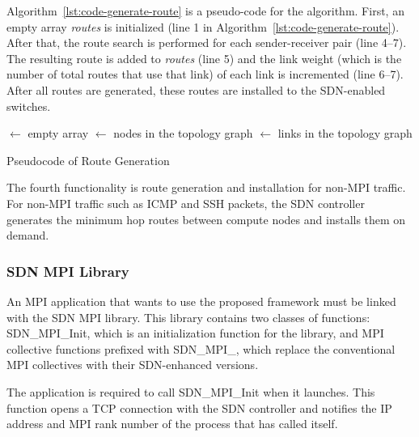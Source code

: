 Algorithm~\ref{lst:code-generate-route} is a pseudo-code for the algorithm.
First, an empty array \emph{routes} is initialized (line 1 in
Algorithm~\ref{lst:code-generate-route}). After that, the route search is
performed for each sender-receiver pair (line 4--7). The resulting route is
added to \emph{routes} (line 5) and the link weight (which is the number of
total routes that use that link) of each link is incremented (line 6--7).
After all routes are generated, these routes are installed to the SDN-enabled
switches.

\begin{algorithm}

    \Routes $\gets$ empty array\;
    \Nodes $\gets$ nodes in the topology graph\;
    \Links $\gets$ links in the topology graph\;


    \caption{Pseudocode of Route Generation}%
    \label{lst:code-generate-route}
\end{algorithm}

The fourth functionality is route generation and installation for
non-MPI traffic. For non-MPI traffic such as ICMP and SSH packets, the
SDN controller generates the minimum hop routes between compute nodes
and installs them on demand.

\subsubsection{SDN MPI Library}

An MPI application that wants to use the proposed framework must be linked
with the SDN MPI library. This library contains two classes of functions:
SDN\_MPI\_Init, which is an initialization function for the library, and
MPI collective functions prefixed with SDN\_MPI\_, which replace the
conventional MPI collectives with their SDN-enhanced versions.

The application is required to call SDN\_MPI\_Init when it launches. This
function opens a TCP connection with the SDN controller and notifies the IP
address and MPI rank number of the process that has called itself.

